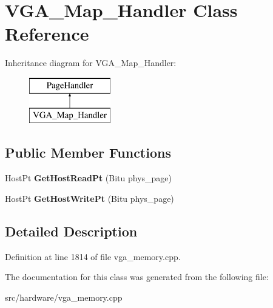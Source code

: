 \hypertarget{classVGA__Map__Handler}{\section{V\-G\-A\-\_\-\-Map\-\_\-\-Handler Class Reference}
\label{classVGA__Map__Handler}
}
Inheritance diagram for V\-G\-A\-\_\-\-Map\-\_\-\-Handler\-:\begin{figure}[H]
\begin{center}
\leavevmode
\includegraphics[height=2.000000cm]{classVGA__Map__Handler}
\end{center}
\end{figure}
\subsection*{Public Member Functions}
\begin{DoxyCompactItemize}
\item 
\hypertarget{classVGA__Map__Handler_a23bc58413fad28c04578297037382551}{Host\-Pt {\bfseries Get\-Host\-Read\-Pt} (Bitu phys\-\_\-page)}\label{classVGA__Map__Handler_a23bc58413fad28c04578297037382551}

\item 
\hypertarget{classVGA__Map__Handler_aaad4aea2654a2d31733a7213894d90a4}{Host\-Pt {\bfseries Get\-Host\-Write\-Pt} (Bitu phys\-\_\-page)}\label{classVGA__Map__Handler_aaad4aea2654a2d31733a7213894d90a4}

\end{DoxyCompactItemize}


\subsection{Detailed Description}


Definition at line 1814 of file vga\-\_\-memory.\-cpp.



The documentation for this class was generated from the following file\-:\begin{DoxyCompactItemize}
\item 
src/hardware/vga\-\_\-memory.\-cpp\end{DoxyCompactItemize}
